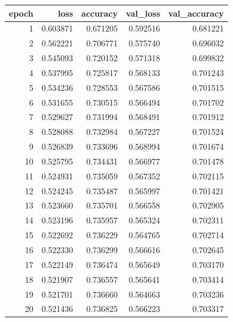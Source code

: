 \begin{tabular}{rrrrr}
\toprule
epoch & loss & accuracy & val_loss & val_accuracy \\
\midrule
1 & 0.603871 & 0.671205 & 0.592516 & 0.681221 \\
2 & 0.562221 & 0.706771 & 0.575740 & 0.696032 \\
3 & 0.545093 & 0.720152 & 0.571318 & 0.699832 \\
4 & 0.537995 & 0.725817 & 0.568133 & 0.701243 \\
5 & 0.534236 & 0.728553 & 0.567586 & 0.701515 \\
6 & 0.531655 & 0.730515 & 0.566494 & 0.701702 \\
7 & 0.529627 & 0.731994 & 0.568491 & 0.701912 \\
8 & 0.528088 & 0.732984 & 0.567227 & 0.701524 \\
9 & 0.526839 & 0.733696 & 0.568994 & 0.701674 \\
10 & 0.525795 & 0.734431 & 0.566977 & 0.701478 \\
11 & 0.524931 & 0.735059 & 0.567352 & 0.702115 \\
12 & 0.524245 & 0.735487 & 0.565997 & 0.701421 \\
13 & 0.523660 & 0.735701 & 0.566558 & 0.702905 \\
14 & 0.523196 & 0.735957 & 0.565324 & 0.702311 \\
15 & 0.522692 & 0.736229 & 0.564765 & 0.702714 \\
16 & 0.522330 & 0.736299 & 0.566616 & 0.702645 \\
17 & 0.522149 & 0.736474 & 0.565649 & 0.703170 \\
18 & 0.521907 & 0.736557 & 0.565641 & 0.703414 \\
19 & 0.521701 & 0.736660 & 0.564663 & 0.703236 \\
20 & 0.521436 & 0.736825 & 0.566223 & 0.703317 \\
\bottomrule
\end{tabular}
